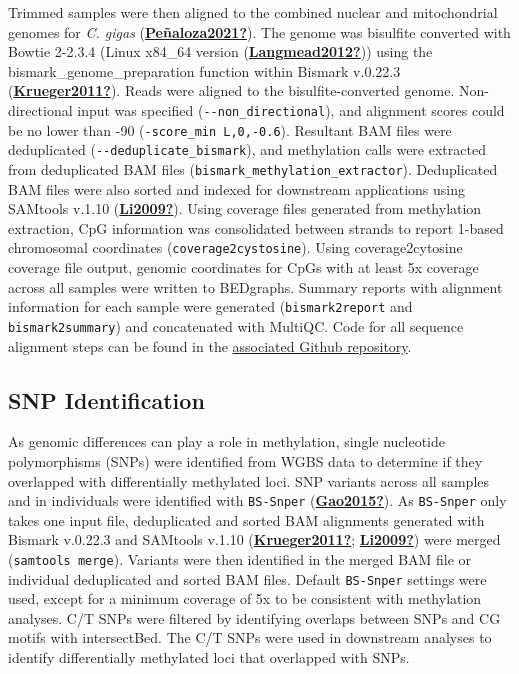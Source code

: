 \documentclass [11pt, proquest] {uwthesis}[2015/03/03]
\begin{document}
Trimmed samples were then aligned to the combined nuclear and mitochondrial genomes for \emph{C. gigas} (\protect\hyperlink{ref-Peuxf1aloza2021}{\textbf{Peñaloza2021?}}). The genome was bisulfite converted with Bowtie 2-2.3.4 (Linux x84\_64 version (\protect\hyperlink{ref-Langmead2012}{\textbf{Langmead2012?}})) using the bismark\_genome\_preparation function within Bismark v.0.22.3 (\protect\hyperlink{ref-Krueger2011}{\textbf{Krueger2011?}}). Reads were aligned to the bisulfite-converted genome. Non-directional input was specified (\texttt{-\/-non\_directional}), and alignment scores could be no lower than -90 (\texttt{-score\_min\ L,0,-0.6}). Resultant BAM files were deduplicated (\texttt{-\/-deduplicate\_bismark}), and methylation calls were extracted from deduplicated BAM files (\texttt{bismark\_methylation\_extractor}). Deduplicated BAM files were also sorted and indexed for downstream applications using SAMtools v.1.10 (\protect\hyperlink{ref-Li2009}{\textbf{Li2009?}}). Using coverage files generated from methylation extraction, CpG information was consolidated between strands to report 1-based chromosomal coordinates (\texttt{coverage2cystosine}). Using coverage2cytosine coverage file output, genomic coordinates for CpGs with at least 5x coverage across all samples were written to BEDgraphs. Summary reports with alignment information for each sample were generated (\texttt{bismark2report} and \texttt{bismark2summary}) and concatenated with MultiQC. Code for all sequence alignment steps can be found in the \href{https://github.com/RobertsLab/project-gigas-oa-meth}{associated Github repository}.

\hypertarget{snp-identification}{%
\subsection{SNP Identification}\label{snp-identification}}

As genomic differences can play a role in methylation, single nucleotide polymorphisms (SNPs) were identified from WGBS data to determine if they overlapped with differentially methylated loci. SNP variants across all samples and in individuals were identified with \texttt{BS-Snper} (\protect\hyperlink{ref-Gao2015}{\textbf{Gao2015?}}). As \texttt{BS-Snper} only takes one input file, deduplicated and sorted BAM alignments generated with Bismark v.0.22.3 and SAMtools v.1.10 (\protect\hyperlink{ref-Krueger2011}{\textbf{Krueger2011?}}; \protect\hyperlink{ref-Li2009}{\textbf{Li2009?}}) were merged (\texttt{samtools\ merge}). Variants were then identified in the merged BAM file or individual deduplicated and sorted BAM files. Default \texttt{BS-Snper} settings were used, except for a minimum coverage of 5x to be consistent with methylation analyses. C/T SNPs were filtered by identifying overlaps between SNPs and CG motifs with intersectBed. The C/T SNPs were used in downstream analyses to identify differentially methylated loci that overlapped with SNPs.
\end{document}
